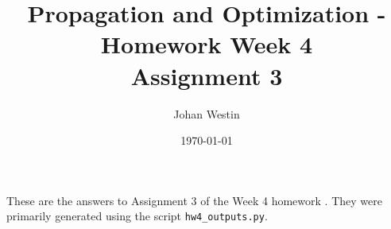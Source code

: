 \documentclass{article}
\title{Propagation and Optimization - Homework Week 4\\Assignment 3}
\author{Johan Westin}
\date{\today}
\begin{document}
\maketitle

These are the answers to Assignment 3 of the Week 4 homework \cite[p.4]{homework-w4}. They were primarily generated using the script \texttt{hw4\_outputs.py}.








\end{document}
